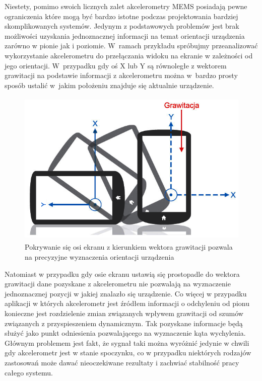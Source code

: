 Niestety, pomimo swoich licznych zalet akcelerometry MEMS posiadają pewne
ograniczenia które mogą być bardzo istotne podczas projektowania bardziej
skomplikowanych systemów. Jedynym z podstawowych problemów jest brak możliwości
uzyskania jednoznacznej informacji na temat orientacji urządzenia zarówno w
pionie jak i poziomie. W~ramach przykładu spróbujmy przeanalizować wykorzystanie
akcelerometru do przełączania widoku na ekranie w zależności od jego orientacji. 
W~przypadku gdy oś X lub Y są równoległe z wektorem grawitacji na podstawie
informacji z akcelerometru można w~bardzo prosty sposób ustalić w~jakim
położeniu znajduje się aktualnie urządzenie.

\begin{figure}[h!]
 \centering
 \includegraphics[height=75mm]{../images/ch04/acc_orientation.png}
 \caption{Pokrywanie się osi ekranu z kierunkiem wektora grawitacji pozwala na
 precyzyjne wyznaczenia orientacji urządzenia\cite{website:elektronikab2b-zyroskop}}
 \label{fig:AkcelerometrOrientation}
\end{figure}

Natomiast w przypadku gdy osie ekranu ustawią się prostopadle do wektora
grawitacji dane pozyskane z akcelerometru nie pozwalają na wyznaczenie
jednoznacznej pozycji w jakiej znalazło się urządzenie\cite{website:elektronikab2b-zyroskop}. Co więcej w
przypadku aplikacji w których akcelerometr jest źródłem informacji o odchyleniu od pionu
konieczne jest rozdzielenie zmian związanych wpływem grawitacji od szumów
związanych z przyspieszeniem dynamicznym. Tak pozyskane informacje będą
służyć jako punkt odniesienia pozwalającego na wyznaczenie kąta wychylenia.
Głównym problemem jest fakt, że sygnał taki można wyróżnić jedynie w chwili gdy
akcelerometr jest w stanie spoczynku, co w przypadku niektórych rodzajów
zastosowań może dawać nieoczekiwane rezultaty i zachwiać stabilność pracy całego
systemu. 

